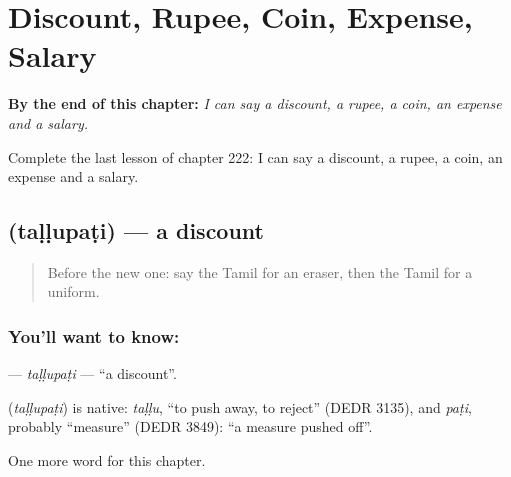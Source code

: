 
\chapter{Discount, Rupee, Coin, Expense, Salary}
\label{ch:ta-discount-rupee-coin-expense-salary}

\begin{chapteropening}
\textbf{By the end of this chapter:} \emph{I can say a discount, a rupee, a coin, an expense and a salary.}

Complete the last lesson of chapter 222: I can say a discount, a rupee, a coin, an expense and a salary.
\end{chapteropening}

\section[\texorpdfstring{\ta{தள்ளுபடி} (taḷḷupaṭi)}{தள்ளுபடி (taḷḷupaṭi)}]{ (taḷḷupaṭi) — a discount}

\label{lesson:TA-C222-tallupati}



\begin{quote}
Before the new one: say the Tamil for an eraser, then the Tamil for a uniform.
\end{quote}

\subsection*{You'll want to know: }
\textbf{} — \emph{taḷḷupaṭi} — \textquotedblleft{}a discount\textquotedblright{}.

\begin{cousinweb}
\textbf{} (\emph{taḷḷupaṭi}) is native: \emph{taḷḷu}, \textquotedblleft{}to push away, to reject\textquotedblright{} (DEDR 3135), and \emph{paṭi}, probably \textquotedblleft{}measure\textquotedblright{} (DEDR 3849): \textquotedblleft{}a measure pushed off\textquotedblright{}.
\end{cousinweb}

\begin{grammarlens}[title={What you've built}]
One more word for this chapter.
\end{grammarlens}

